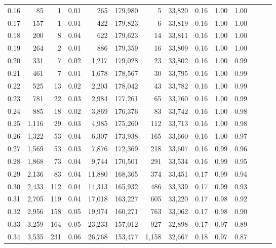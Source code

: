 \begin{tabular}{rrrrrrrrrrrrrr}
0.16 &     85 &      1 &  0.01 &      265 &  179,980 &       5 &  33,820 &  0.16 &  1.00 &      1.00 \\
0.17 &    157 &      1 &  0.01 &      422 &  179,823 &       6 &  33,819 &  0.16 &  1.00 &      1.00 \\
0.18 &    200 &      8 &  0.04 &      622 &  179,623 &      14 &  33,811 &  0.16 &  1.00 &      1.00 \\
0.19 &    264 &      2 &  0.01 &      886 &  179,359 &      16 &  33,809 &  0.16 &  1.00 &      1.00 \\
0.20 &    331 &      7 &  0.02 &    1,217 &  179,028 &      23 &  33,802 &  0.16 &  1.00 &      0.99 \\
0.21 &    461 &      7 &  0.01 &    1,678 &  178,567 &      30 &  33,795 &  0.16 &  1.00 &      0.99 \\
0.22 &    525 &     13 &  0.02 &    2,203 &  178,042 &      43 &  33,782 &  0.16 &  1.00 &      0.99 \\
0.23 &    781 &     22 &  0.03 &    2,984 &  177,261 &      65 &  33,760 &  0.16 &  1.00 &      0.99 \\
0.24 &    885 &     18 &  0.02 &    3,869 &  176,376 &      83 &  33,742 &  0.16 &  1.00 &      0.98 \\
0.25 &  1,116 &     29 &  0.03 &    4,985 &  175,260 &     112 &  33,713 &  0.16 &  1.00 &      0.98 \\
0.26 &  1,322 &     53 &  0.04 &    6,307 &  173,938 &     165 &  33,660 &  0.16 &  1.00 &      0.97 \\
0.27 &  1,569 &     53 &  0.03 &    7,876 &  172,369 &     218 &  33,607 &  0.16 &  0.99 &      0.96 \\
0.28 &  1,868 &     73 &  0.04 &    9,744 &  170,501 &     291 &  33,534 &  0.16 &  0.99 &      0.95 \\
0.29 &  2,136 &     83 &  0.04 &   11,880 &  168,365 &     374 &  33,451 &  0.17 &  0.99 &      0.94 \\
0.30 &  2,433 &    112 &  0.04 &   14,313 &  165,932 &     486 &  33,339 &  0.17 &  0.99 &      0.93 \\
0.31 &  2,705 &    119 &  0.04 &   17,018 &  163,227 &     605 &  33,220 &  0.17 &  0.98 &      0.92 \\
0.32 &  2,956 &    158 &  0.05 &   19,974 &  160,271 &     763 &  33,062 &  0.17 &  0.98 &      0.90 \\
0.33 &  3,259 &    164 &  0.05 &   23,233 &  157,012 &     927 &  32,898 &  0.17 &  0.97 &      0.89 \\
0.34 &  3,535 &    231 &  0.06 &   26,768 &  153,477 &   1,158 &  32,667 &  0.18 &  0.97 &      0.87 \\

\end{tabular}
